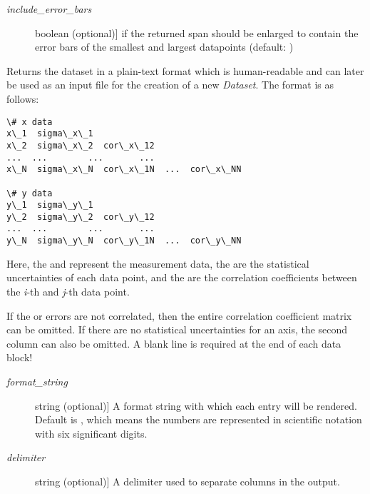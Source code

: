 \documentclass[a4paper,10pt,english]{sphinxmanual}
\begin{document}
\begin{fulllineitems}
\begin{fulllineitems}
\begin{description}
\item[{\emph{include\_error\_bars}}] \leavevmode{[}boolean (optional){]}
 if the returned span should be enlarged to
contain the error bars of the smallest and largest datapoints (default: )

\end{description}

\end{fulllineitems}


\begin{fulllineitems}
\label{index:kafe.dataset.Dataset.get_formatted}
Returns the dataset in a plain-text format which is human-readable and
can later be used as an input file for the creation of a new \emph{Dataset}.
\label{index:get-formatted}
The format is as follows:

\begin{Verbatim}[commandchars=\\\{\}]
\# x data
x\_1  sigma\_x\_1  
x\_2  sigma\_x\_2  cor\_x\_12
...  ...        ...       ...
x\_N  sigma\_x\_N  cor\_x\_1N  ...  cor\_x\_NN

\# y data
y\_1  sigma\_y\_1  
y\_2  sigma\_y\_2  cor\_y\_12
...  ...        ...       ...
y\_N  sigma\_y\_N  cor\_y\_1N  ...  cor\_y\_NN
\end{Verbatim}

Here, the  and  represent the measurement data, the  are the
statistical uncertainties of each data point, and the  are the correlation
coefficients between the \emph{i}-th and \emph{j}-th data point.

If the  or  errors are not correlated, then the entire correlation coefficient matrix
can be omitted. If there are no statistical uncertainties for an axis, the second
column can also be omitted. A blank line is required at the end of each data block!
\begin{description}
\item[{\emph{format\_string}}] \leavevmode{[}string (optional){]}
A format string with which each entry will be rendered. Default is , which means
the numbers are represented in scientific notation with six significant digits.

\item[{\emph{delimiter}}] \leavevmode{[}string (optional){]}
A delimiter used to separate columns in the output.


\end{description}
\end{fulllineitems}
\end{fulllineitems}
\end{document}
